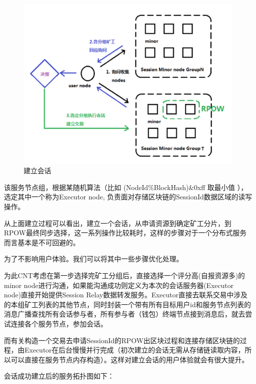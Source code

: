 \documentclass[a4paper,12pt]{article}
\begin{document}
\begin {figure} [htbp]
\centering \includegraphics [width = 5in] {pic_cn/c4.png}
\caption {建立会话} \label {fig: c4}
\end {figure}

该服务节点组，根据某随机算法（比如 (NodeId\%BlockHash)\&0xff 取最小值 ），选定其中一个称为Executor node, 负责面对存储区块链的SessionId数据区域的读写操作。

从上面建立过程可以看出，建立一个会话，从申请资源到确定矿工分片，到RPOW最终同步选择，这一系列操作比较耗时，这样的步骤对于一个分布式服务而言基本是不可回避的。

为了不影响用户体验。我们可以将其中一些步骤优化处理。

为此CNT考虑在第一步选择完矿工分组后，直接选择一个评分高(自报资源多)的minor node进行沟通，如果能沟通成功则定义为本次的会话服务器(Executor node)直接开始提供Session Relay数据转发服务。Executor直接去联系交易中涉及的本组矿工列表的其他节点，同时封装一个带有所有目标用户id和服务节点列表的消息广播查找所有会话参与者，所有参与者（钱包）终端节点接到消息后，就去尝试连接各个服务节点，参加会话。

而有关构造一个交易去申请SessionId的RPOW出区块过程和连接存储区块链的过程，由Executor在后台慢慢并行完成（初次建立的会话无需从存储链读取内容，所以可以直接在服务节点内存构造）。这样对建立会话的用户体验就会有很大提升。

会话成功建立后的服务拓扑图如下：
\end{document}
